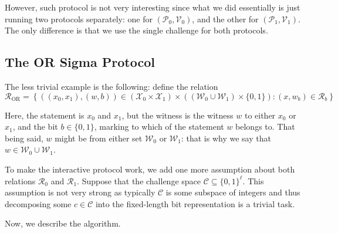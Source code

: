 \documentclass[../lecture-notes.tex]{subfiles}
\begin{document}
However, such protocol is not very interesting since what we did essentially is just running two protocols separately: one for $(\mathcal{P}_0,\mathcal{V}_0)$, and the other for $(\mathcal{P}_1,\mathcal{V}_1)$. The only difference is that we use the single challenge for both protocols.

\subsection{The OR Sigma Protocol}

The less trivial example is the following: define the relation
\begin{equation*}
    \mathcal{R}_{\text{OR}} = \left\{ ((x_0, x_1), (w, b)) \in (\mathcal{X}_0 \times \mathcal{X}_1) \times ((\mathcal{W}_0 \cup \mathcal{W}_1) \times \{0,1\}): (x, w_b) \in \mathcal{R}_b \right\}
\end{equation*}

Here, the statement is $x_0$ and $x_1$, but the witness is the witness $w$ to either $x_0$ or $x_1$, and the bit $b \in \{0,1\}$, marking to which of the statement $w$ belongs to. That being said, $w$ might be from either set $\mathcal{W}_0$ or $\mathcal{W}_1$: that is why we say that $w \in \mathcal{W}_0 \cup \mathcal{W}_1$.

To make the interactive protocol work, we add one more assumption about both relations $\mathcal{R}_0$ and $\mathcal{R}_1$. Suppose that the challenge space $\mathcal{C} \subseteq \{0,1\}^{\ell}$. This assumption is not very strong as typically $\mathcal{C}$ is some subspace of integers and thus decomposing some $c \in \mathcal{C}$ into the fixed-length bit representation is a trivial task.

Now, we describe the algorithm.
\end{document}
